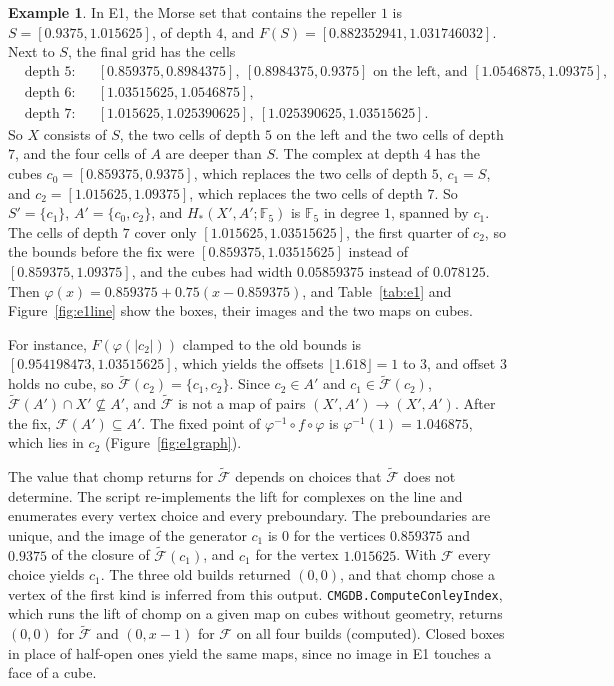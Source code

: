 \documentclass[11pt]{article}
\theoremstyle{plain}
\theoremstyle{definition}
\newtheorem{example}[proposition]{Example}
\theoremstyle{remark}
\newcommand{\F}{\mathbb{F}_5}
\newcommand{\Fc}{\mathcal{F}}
\newcommand{\Ft}{\tilde{\mathcal{F}}}
\newcommand{\code}[1]{\texttt{#1}}
\begin{document}
\begin{example}\label{ex:e1}
In E1, the Morse set that contains the repeller $1$ is $S=[0.9375,1.015625]$, of depth $4$, and $F(S)=[0.882352941,1.031746032]$. Next to $S$, the final grid has the cells
\[
\begin{aligned}
&\text{depth } 5\text{:} && [0.859375,0.8984375],\ [0.8984375,0.9375] \text{ on the left, and } [1.0546875,1.09375],\\
&\text{depth } 6\text{:} && [1.03515625,1.0546875],\\
&\text{depth } 7\text{:} && [1.015625,1.025390625],\ [1.025390625,1.03515625].
\end{aligned}
\]
So $X$ consists of $S$, the two cells of depth $5$ on the left and the two cells of depth $7$, and the four cells of $A$ are deeper than $S$. The complex at depth $4$ has the cubes $c_0=[0.859375,0.9375]$, which replaces the two cells of depth $5$, $c_1=S$, and $c_2=[1.015625,1.09375]$, which replaces the two cells of depth $7$. So $S'=\{c_1\}$, $A'=\{c_0,c_2\}$, and $H_*(X',A';\F)$ is $\F$ in degree $1$, spanned by $c_1$. The cells of depth $7$ cover only $[1.015625,1.03515625]$, the first quarter of $c_2$, so the bounds before the fix were $[0.859375,1.03515625]$ instead of $[0.859375,1.09375]$, and the cubes had width $0.05859375$ instead of $0.078125$. Then $\varphi(x)=0.859375+0.75(x-0.859375)$, and Table~\ref{tab:e1} and Figure~\ref{fig:e1line} show the boxes, their images and the two maps on cubes.

For instance, $F(\varphi(|c_2|))$ clamped to the old bounds is $[0.954198473,1.03515625]$, which yields the offsets $\lfloor1.618\rfloor=1$ to $3$, and offset $3$ holds no cube, so $\Ft(c_2)=\{c_1,c_2\}$. Since $c_2\in A'$ and $c_1\in\Ft(c_2)$, $\Ft(A')\cap X'\not\subseteq A'$, and $\Ft$ is not a map of pairs $(X',A')\to(X',A')$. After the fix, $\Fc(A')\subseteq A'$. The fixed point of $\varphi^{-1}\circ f\circ\varphi$ is $\varphi^{-1}(1)=1.046875$, which lies in $c_2$ (Figure~\ref{fig:e1graph}).

The value that chomp returns for $\Ft$ depends on choices that $\Ft$ does not determine. The script  re-implements the lift for complexes on the line and enumerates every vertex choice and every preboundary. The preboundaries are unique, and the image of the generator $c_1$ is $0$ for the vertices $0.859375$ and $0.9375$ of the closure of $\Ft(c_1)$, and $c_1$ for the vertex $1.015625$. With $\Fc$ every choice yields $c_1$. The three old builds returned $(0,0)$, and that chomp chose a vertex of the first kind is inferred from this output. \code{CMGDB.ComputeConleyIndex}, which runs the lift of chomp on a given map on cubes without geometry, returns $(0,0)$ for $\Ft$ and $(0,x-1)$ for $\Fc$ on all four builds (computed). Closed boxes in place of half-open ones yield the same maps, since no image in E1 touches a face of a cube.
\end{example}
\end{document}
